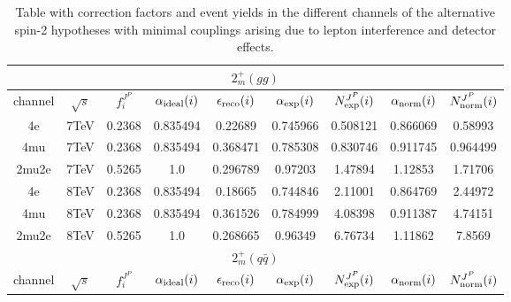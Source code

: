 \begin{table}[b]
\centering
\caption{
Table with correction factors and event yields in the different
channels of the alternative spin-2 hypotheses with minimal
couplings arising due to lepton interference and detector effects.}
\centering %
\begin{tabular}{c c c c c c c c c} %
\hline \hline
 \multicolumn{9}{|c|}{$2^{+}_{m} (gg)$} \\ \hline 
channel & $\sqrt{s}$ & $f_{i}^{J^P}$ & $\alpha_{\rm ideal} (i)$ & $\epsilon_{\rm reco} (i)$ & $\alpha_{\rm exp} (i)$ & $N^{J^P}_{\rm exp} (i)$ & $\alpha_{\rm norm} (i)$ & $N^{J^P}_{\rm norm} (i)$\\ \hline 
4e & 7TeV & 0.2368 & 0.835494 & 0.22689 & 0.745966
 & 0.508121%
 & 0.866069 & 0.58993 \\ \hline 4mu & 7TeV & 0.2368 & 0.835494 & 0.368471 & 0.785308
 & 0.830746%
 & 0.911745 & 0.964499 \\ \hline 2mu2e & 7TeV & 0.5265 & 1.0  & 0.296789 & 0.97203
 & 1.47894%
 & 1.12853 & 1.71706 \\ \hline \hline 
4e & 8TeV & 0.2368 & 0.835494 & 0.18665 & 0.744846
 & 2.11001%
 & 0.864769 & 2.44972 \\ \hline 4mu & 8TeV & 0.2368 & 0.835494 & 0.361526 & 0.784999
 & 4.08398%
 & 0.911387 & 4.74151 \\ \hline 2mu2e & 8TeV & 0.5265 & 1.0  & 0.268665 & 0.96349
 & 6.76734%
 & 1.11862 & 7.8569 \\ \hline \hline 
 \multicolumn{9}{|c|}{$2^{+}_{m} (q\bar{q})$} \\ \hline 
channel & $\sqrt{s}$ & $f_{i}^{J^P}$ & $\alpha_{\rm ideal} (i)$ & $\epsilon_{\rm reco} (i)$ & $\alpha_{\rm exp} (i)$ & $N^{J^P}_{\rm exp} (i)$ & $\alpha_{\rm norm} (i)$ & $N^{J^P}_{\rm norm} (i)$\\ \hline 

\end{tabular}
\end{table}
